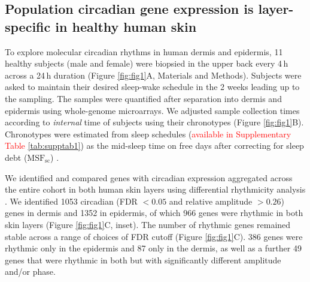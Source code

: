 \subsection*{Population circadian gene expression is layer-specific in healthy human skin} 
To explore molecular circadian rhythms in human dermis and epidermis, 11 healthy subjects (male and female) were biopsied in the upper back every 4\,h across a 24\,h duration (Figure \ref{fig:fig1}A, Materials and Methods). Subjects were asked to maintain their desired sleep-wake schedule in the 2 weeks leading up to the sampling. The samples were quantified after separation into dermis and epidermis using whole-genome microarrays. We adjusted sample collection times according to \emph{internal} time of subjects using their chronotypes (Figure \ref{fig:fig1}B). Chronotypes were estimated from sleep schedules (\textcolor{red}{available in Supplementary Table \ref{tab:supptab1}}) as the mid-sleep time on free days after correcting for sleep debt ($\textrm{MSF}_\textrm{sc}$) \cite{Vetter2021}. 

We identified and compared genes with circadian expression aggregated across the entire cohort in both human skin layers using differential rhythmicity analysis \cite{Pelikan2021}. We identified 1053 circadian (FDR $<0.05$ and relative amplitude $>0.26$) genes in dermis and 1352 in epidermis, of which 966 genes were rhythmic in both skin layers (Figure \ref{fig:fig1}C, inset). The number of rhythmic genes remained stable across a range of choices of FDR cutoff (Figure \ref{fig:fig1}C). 386 genes were rhythmic only in the epidermis and 87 only in the dermis, as well as a further 49 genes that were rhythmic in both but with significantly different amplitude and/or phase.

